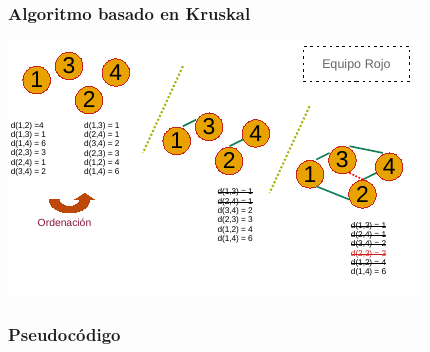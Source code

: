 \documentclass[13pt]{beamer}
\begin{document}
    \begin{frame}
		\frametitle{Algoritmo basado en Kruskal}
		\begin{center}
			\includegraphics[scale=1.5]{./img/DibPropio.pdf}
		\end{center}
	\end{frame}

	\begin{frame}
		\frametitle{Pseudocódigo}

	\end{frame}
\end{document}
